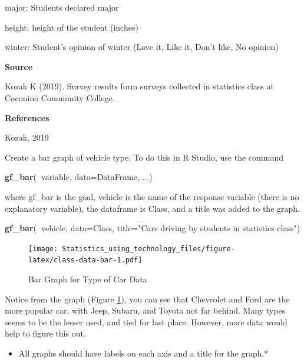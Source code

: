 \documentclass[
]{book}
\newenvironment{Shaded}{\begin{snugshade}}{\end{snugshade}}
\newcommand{\DataTypeTok}[1]{\textcolor[rgb]{0.13,0.29,0.53}{#1}}
\newcommand{\KeywordTok}[1]{\textcolor[rgb]{0.13,0.29,0.53}{\textbf{#1}}}
\newcommand{\NormalTok}[1]{#1}
\newcommand{\OperatorTok}[1]{\textcolor[rgb]{0.81,0.36,0.00}{\textbf{#1}}}
\newcommand{\StringTok}[1]{\textcolor[rgb]{0.31,0.60,0.02}{#1}}
\providecommand{\tightlist}{%
  \setlength{\itemsep}{0pt}\setlength{\parskip}{0pt}}
\begin{document}
major: Students declared major

height: height of the student (inches)

winter: Student's opinion of winter (Love it, Like it, Don't like, No opinion)

\textbf{Source}

Kozak K (2019). Survey results form surveys collected in statistics class at Coconino Community College.

\textbf{References}

Kozak, 2019

Create a bar graph of vehicle type. To do this in R Studio, use the command

\begin{Shaded}
\begin{Highlighting}[]
\KeywordTok{gf_bar}\NormalTok{(}\OperatorTok{~}\NormalTok{variable, }\DataTypeTok{data=}\NormalTok{DataFrame, ...)}
\end{Highlighting}
\end{Shaded}

where gf\_bar is the goal, vehicle is the name of the response variable (there is no explanatory variable), the dataframe is Class, and a title was added to the graph.



\begin{Shaded}
\begin{Highlighting}[]
\KeywordTok{gf_bar}\NormalTok{(}\OperatorTok{~}\NormalTok{vehicle, }\DataTypeTok{data=}\NormalTok{Class, }\DataTypeTok{title=}\StringTok{"Cars driving by students in }
\StringTok{       statistics class"}\NormalTok{)}
\end{Highlighting}
\end{Shaded}

\begin{figure}
\centering
\texttt{[image: Statistics\_using\_technology\_files/figure-latex/class-data-bar-1.pdf]}
\caption{\label{fig:class-data-bar}Bar Graph for Type of Car Data}
\end{figure}

Notice from the graph (Figure \ref{fig:class-data-bar}), you can see that Chevrolet and Ford are the more popular car, with Jeep, Subaru, and Toyota not far behind. Many types seems to be the lesser used, and tied for last place. However, more data would help to figure this out.

\begin{itemize}
\tightlist
\item
  All graphs should have labels on each axis and a title for the graph.*
\end{itemize}
\end{document}

